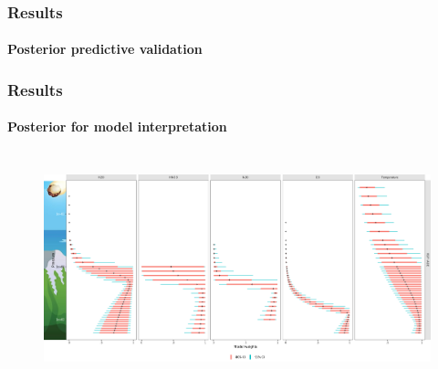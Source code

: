 \documentclass{snedecorbeamer}
\begin{document}
\begin{frame}[c]
  \frametitle{Results}
  \framesubtitle{Posterior predictive validation}

  \begin{table}
    \caption*{%
      Mean validation statistics:~RMSE (left) and negative PPLD (right).\\
      Smaller values are better. Bold is best in class.
    }%
    \label{tab:validation-statistics-mini}
  \end{table}

\end{frame}

\begin{frame}
  \frametitle{Results}
  \framesubtitle{Posterior for model interpretation}

  \begin{figure}
      \centering
    \includegraphics[height=18em]{inc/mls_weight_posterior_oaat.png}
  \end{figure}




\end{frame}
\end{document}
